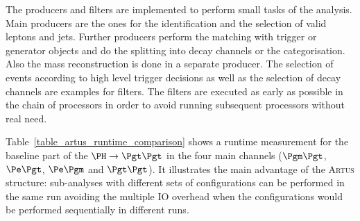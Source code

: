 \documentclass[3p]{elsarticle}
\newcommand{\software}[1]{\textsc{#1}\xspace}
\newcommand{\artus}{\software{Artus}}
\begin{document}
The producers and filters are implemented to perform small tasks of the analysis.
Main producers are the ones for the identification and the selection of valid leptons and jets.
Further producers perform the matching with trigger or generator objects and do the splitting into decay channels or the categorisation.
Also the mass reconstruction is done in a separate producer.
The selection of events according to high level trigger decisions as well as the selection of decay channels are examples for filters.
The filters are executed as early as possible in the chain of processors in order to avoid running subsequent processors without real need.

Table~\ref{table_artus_runtime_comparison} shows a runtime measurement for the baseline part of the $\PH\to\Pgt\Pgt$ in the four main channels ($\Pgm\Pgt$, $\Pe\Pgt$, $\Pe\Pgm$ and $\Pgt\Pgt$).
It illustrates the main advantage of the \artus structure: sub-analyses with different sets of configurations can be performed in the same run avoiding the multiple IO overhead when the configurations would be performed sequentially in different runs.
\end{document}
